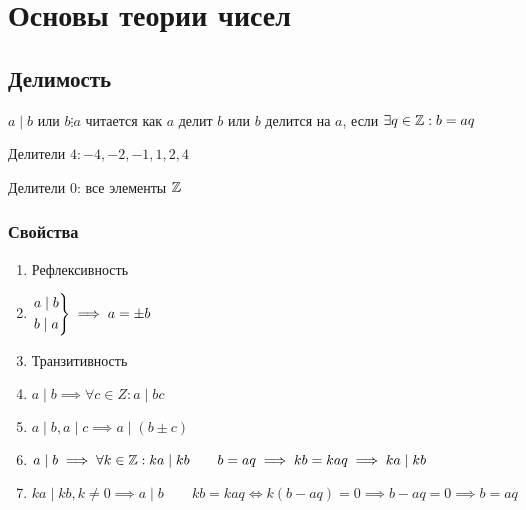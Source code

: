 \documentclass[main]{subfiles}
\begin{document}
\part{Основы теории чисел}
\chapter{Делимость}

$a \mid b$ или $b\vdots a$ читается как $a$ делит $b$ или $b$ делится на $a$,
если $\exists q \in \mathbb{Z}:b=aq$

\begin{example}
    Делители $4: -4, -2, -1, 1,2,4$

    Делители 0: все элементы $\mathbb{Z}$
\end{example}

\section{Свойства}
\begin{enumerate}
    \item Рефлексивность
    \item $\begin{rcases}
                  a \mid b \\
                  b \mid a
              \end{rcases} \implies a = \pm b$
    \item Транзитивность
    \item $a \mid b \implies \forall c \in Z: a \mid bc$
    \item $a \mid b, a\mid c \implies a\mid (b \pm c)$
    \item $a \mid  b \implies \forall k\in \mathbb{Z}: ka \mid kb \qquad b = aq \implies
              kb = kaq \implies ka \mid kb$
    \item $ka \mid kb, k \neq 0 \implies a \mid b \qquad kb = kaq \Leftrightarrow
              k(b-aq)=0 \implies b-aq=0 \implies b=aq$
\end{enumerate}
\end{document}

